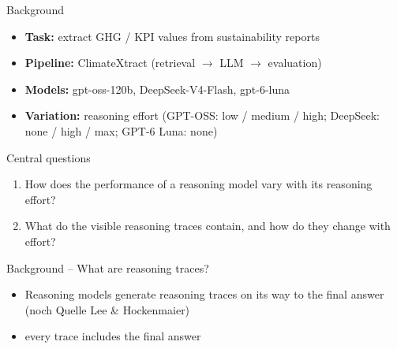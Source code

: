 \documentclass[aspectratio=169, 10pt]{beamer}
\begin{document}
\begin{frame}{Background}
\begin{itemize}
  \item \textbf{Task:} extract GHG / KPI values from sustainability reports
  \item \textbf{Pipeline:} ClimateXtract (retrieval $\rightarrow$ LLM $\rightarrow$ evaluation)
  \item \textbf{Models:} gpt-oss-120b, DeepSeek-V4-Flash, gpt-6-luna
  \item \textbf{Variation:} reasoning effort (GPT-OSS: low / medium / high; DeepSeek: none / high / max; GPT-6 Luna: none)
\end{itemize}
\vspace{0.6em}
\begin{block}{Central questions}
\begin{enumerate}
    \item How does the performance of a reasoning model vary with its reasoning effort?
    \item What do the visible reasoning traces contain, and how do they change with effort?
\end{enumerate}

\end{block}
\end{frame}

\begin{frame}{Background -- What are reasoning traces?}
\begin{itemize}
  \item Reasoning models generate reasoning traces on its way to the final answer (noch Quelle Lee \& Hockenmaier)
  \item every trace includes the final answer 
\end{itemize}
\end{frame}
\end{document}
